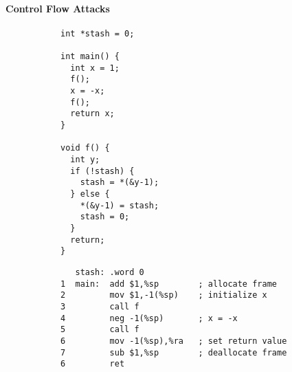 \documentclass[acmsmall,review,anonymous]{acmart}\settopmatter{printfolios=true,printccs=false,printacmref=false}
\begin{document}
\paragraph*{Control Flow Attacks}
\begin{figure}
  \centering
  \begin{subfigure}{.3\textwidth}
{\small
\begin{verbatim}
int *stash = 0;

int main() {
  int x = 1;
  f();
  x = -x;
  f();
  return x;
}

void f() {
  int y;
  if (!stash) {
    stash = *(&y-1);
  } else {
    *(&y-1) = stash;
    stash = 0;
  }
  return;
}
\end{verbatim}
}
\end{subfigure}
  \begin{subfigure}{.65\textwidth}
{\small
\begin{verbatim}
   stash: .word 0
1  main:  add $1,%sp        ; allocate frame
2         mov $1,-1(%sp)    ; initialize x
3         call f
4         neg -1(%sp)       ; x = -x
5         call f
6         mov -1(%sp),%ra   ; set return value
7         sub $1,%sp        ; deallocate frame
6         ret


\end{verbatim}}
\end{subfigure}
\end{figure}
\end{document}
